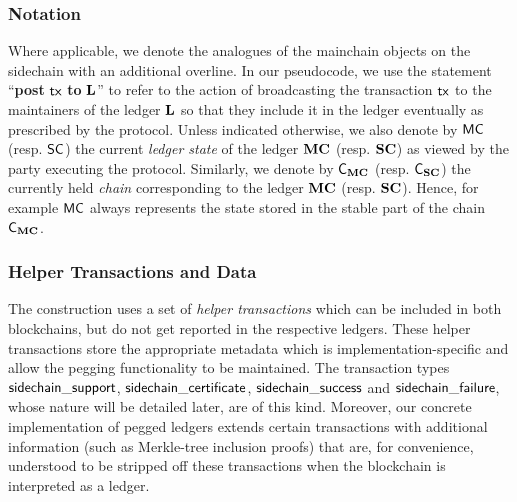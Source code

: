 \subsubsection{Notation}
Where applicable, we denote the analogues of the mainchain objects on the
sidechain with an additional overline.
%
In our pseudocode, we use the statement
``\textbf{post} $\mathsf{tx}$ \textbf{to} $\mathbf{L}$''
to refer to the
action of broadcasting the transaction $\mathsf{tx}$ to the maintainers of the ledger
$\mathbf{L}$ so that they include it in the ledger eventually as prescribed by the
protocol.
Unless indicated otherwise, we also denote by $\mathsf{MC}$ (resp.
$\mathsf{SC}$) the current \emph{ledger state} of the ledger $\mathbf{MC}$ (resp. $\mathbf{SC}$) as
viewed by the party executing the protocol. Similarly, we denote by $\mathsf{C_{\mathbf{MC}}}$
(resp. $\mathsf{C_{\mathbf{SC}}}$) the currently held \emph{chain} corresponding to the ledger
$\mathbf{MC}$ (resp. $\mathbf{SC}$). Hence, for example $\mathsf{MC}$ always represents the state
stored in the stable part of the chain $\mathsf{C_{\mathbf{MC}}}$.

\subsubsection{Helper Transactions and Data}
The construction uses a set of \textit{helper transactions}
which can be included in both blockchains, but do not get reported
in the respective ledgers. These helper transactions store the appropriate
metadata which is implementation-specific and allow the pegging functionality to be
maintained. The transaction types $\mathsf{side}\-\mathsf{chain\_support}$,
$\mathsf{side}\-\mathsf{chain\_certificate}$,
$\mathsf{side}\-\mathsf{chain\_success}$ and
$\mathsf{side}\-\mathsf{chain\_fai}\-\mathsf{lure}$, whose nature will be
detailed later, are of this kind.
Moreover, our concrete implementation of pegged ledgers extends certain
transactions with additional information (such as Merkle-tree inclusion proofs)
that are, for convenience, understood to be stripped off these transactions when
the blockchain is interpreted as a ledger.

